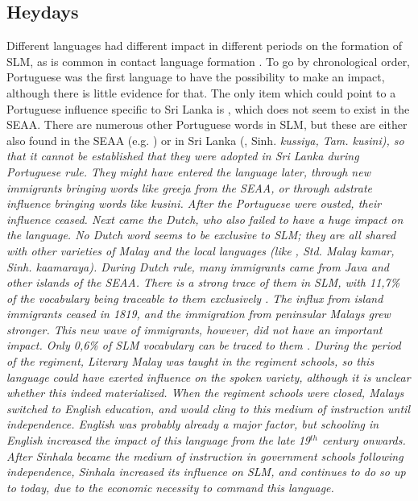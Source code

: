 \subsection{Heydays}
Different languages had different impact in different periods on the formation of SLM, as is common in contact language formation \citep{Arends1989,Roberts2004phd,Lim2007merger}. To go by chronological order, Portuguese was the first language to have the possibility to make an impact, although there is little evidence for that. The only item which could point to a Portuguese influence specific to Sri Lanka is , which does not seem to exist in the SEAA. There are numerous other Portuguese words in SLM, but these are either also found in the SEAA (e.g. ) or in Sri Lanka (, Sinh. \em kussiya, \em Tam. \em kusini\em), so that it cannot be established that they were adopted in Sri Lanka during Portuguese rule. They might have entered the language later, through new immigrants bringing words like \em greeja \em from the SEAA, or through adstrate influence bringing words like \em kusini\em. After the Portuguese were ousted, their influence ceased. Next came the Dutch, who also failed to have a huge impact on the language. No Dutch word seems to be exclusive to SLM; they are all shared with other varieties of Malay and the local languages (like , Std. Malay \em kamar\em, Sinh. \em kaamaraya\em). During Dutch rule, many immigrants came from Java and other islands of the SEAA.
There is a strong trace of them in SLM, with 11,7\% of the vocabulary being traceable to them exclusively \citep{Paauw2004}. The influx from island immigrants ceased in 1819, and the immigration from peninsular Malays grew stronger. This new wave of immigrants, however, did not have an important impact. Only 0,6\% of SLM vocabulary can be traced to them \citep{Paauw2004}.
During the period of the regiment, Literary Malay was taught in the regiment schools, so  this language could have exerted influence on the spoken variety, although it is unclear whether this indeed materialized. When the regiment schools were closed, Malays switched to English education, and would cling to this medium of instruction until independence. English was probably already a major factor, but schooling in English increased the impact of this language from the late 19$^{th}$ century onwards. After Sinhala became the medium of instruction in government schools following independence, Sinhala increased its influence on SLM, and continues to do so up to today, due to the economic necessity to command this language.

